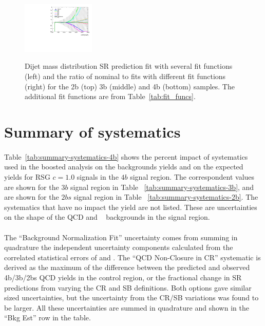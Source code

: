 \begin{figure}[htbp!]
\begin{center}
\includegraphics[width=0.31\textwidth,angle=-90]{figures/boosted/Syst_Smooth/smoothFuncCompare_44_comp_ratio.pdf} \\
\caption{ Dijet mass distribution SR prediction fit with several fit functions (left) and the ratio of nominal to fits with different fit functions (right)  for the 2b (top) 3b (middle) and 4b (bottom) samples. The additional fit functions are from Table~\ref{tab:fit_funcs}.}
\label{fig:qcd_fit_funcs_sys}
\end{center}
\end{figure}


\section{Summary of systematics}
\label{sec:boosted-systematics-numbers}

\paragraph{}
Table~\ref{tab:summary-systematics-4b} shows the percent impact of systematics used in the boosted analysis on the backgrounds yields and on the expected yields for RSG $c=1.0$ signals in the $4b$ signal region.
The correspondent values are shown for the $3b$ signal region in Table ~\ref{tab:summary-systematics-3b}, and are shown for the $2bs$ signal region in Table ~\ref{tab:summary-systematics-2b}.
The systematics that have no impact the yield are not listed. 
These are uncertainties on the shape of the QCD and \ttbar~ backgrounds in the signal region.

\paragraph{}
The ``Background Normalization Fit'' uncertainty comes from summing in quadrature the independent uncertainty components calculated from the correlated statistical errors of \muqcd and \alphatt. 
The ``QCD Non-Closure in CR'' systematic is derived as the maximum of the difference between the predicted and observed 4b/3b/2bs QCD yields in the control region, or the fractional change in SR predictions from varying the CR and SB definitions.
Both options gave similar sized uncertainties, but the uncertainty from the CR/SB variations was found to be larger. 
All these uncertainties are summed in quadrature and shown in the ``Bkg Est'' row in the table.

